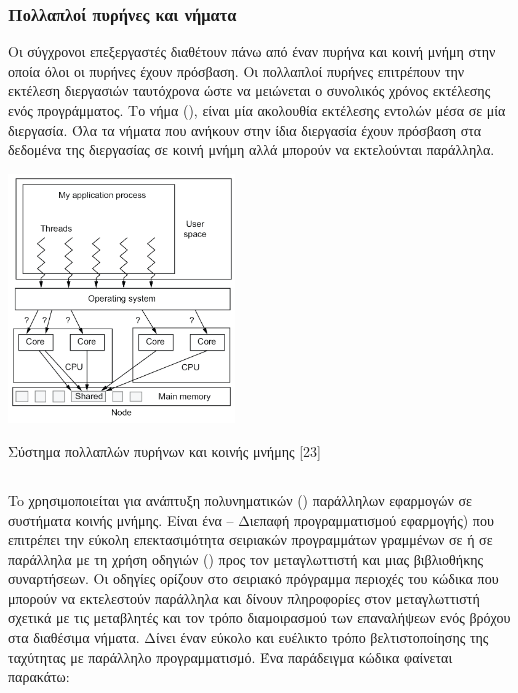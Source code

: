 \subsubsection{Πολλαπλοί πυρήνες και νήματα}

Οι σύγχρονοι επεξεργαστές διαθέτουν πάνω από έναν πυρήνα και κοινή μνήμη στην οποία όλοι οι πυρήνες έχουν πρόσβαση. Οι πολλαπλοί πυρήνες επιτρέπουν την εκτέλεση διεργασιών ταυτόχρονα ώστε να μειώνεται ο συνολικός χρόνος εκτέλεσης ενός προγράμματος. Το νήμα (), είναι μία ακολουθία εκτέλεσης εντολών μέσα σε μία διεργασία. Όλα τα νήματα που ανήκουν στην ίδια διεργασία έχουν πρόσβαση στα δεδομένα της διεργασίας σε κοινή μνήμη αλλά μπορούν να εκτελούνται παράλληλα.
 
\begin{Illustration}[!h] 
	\centering
	\includegraphics[width=0.45\textwidth]{images/image045.png} 
	\caption{Σύστημα πολλαπλών πυρήνων και κοινής μνήμης [23]}
	\label{image-multicore-shared-mem}
\end{Illustration}

\subsection{}

To  χρησιμοποιείται για ανάπτυξη πολυνηματικών () παράλληλων εφαρμογών σε συστήματα κοινής μνήμης. Είναι ένα  – Διεπαφή προγραμματισμού εφαρμογής) που επιτρέπει την εύκολη επεκτασιμότητα σειριακών προγραμμάτων γραμμένων σε  ή  σε παράλληλα με τη χρήση οδηγιών () προς τον μεταγλωττιστή και μιας βιβλιοθήκης συναρτήσεων. Οι οδηγίες ορίζουν στο σειριακό πρόγραμμα περιοχές του κώδικα που μπορούν να εκτελεστούν παράλληλα και δίνουν πληροφορίες στον μεταγλωττιστή σχετικά με τις μεταβλητές και τον τρόπο διαμοιρασμού των επαναλήψεων ενός βρόχου στα διαθέσιμα νήματα. Δίνει έναν εύκολο και ευέλικτο τρόπο βελτιστοποίησης της ταχύτητας με παράλληλο προγραμματισμό. 
Ένα παράδειγμα κώδικα φαίνεται παρακάτω:

